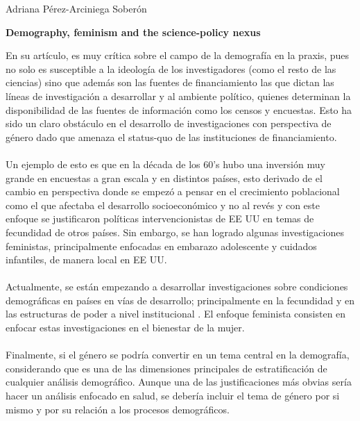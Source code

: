 \documentclass[11pt,spanish,letterpaper]{article}
\theoremstyle{plain}
\begin{document}
\begin{flushleft}
Adriana P\'erez-Arciniega Sober\'on
\end{flushleft}
\begin{center}
\textbf{Demography, feminism and the science-policy nexus}
\end{center} 
En su art\'iculo, \citep{presser1997demography} es muy cr\'itica sobre el campo de la demograf\'ia en la praxis, pues no solo es susceptible a la ideolog\'ia de los investigadores (como el resto de las ciencias)  sino que adem\'as son las fuentes de financiamiento las que dictan las l\'ineas de investigaci\'on a desarrollar y al ambiente pol\'itico, quienes determinan la disponibilidad de las fuentes de informaci\'on como los censos y encuestas. Esto ha sido un claro obst\'aculo en el desarrollo de investigaciones con perspectiva de g\'enero dado que amenaza el status-quo de las instituciones de financiamiento.\\
\\
Un ejemplo de esto es que en la d\'ecada de los 60's hubo una inversi\'on muy grande en encuestas a gran escala y en distintos pa\'ises, esto derivado de el cambio en perspectiva donde se empez\'o a pensar en el crecimiento poblacional como el que afectaba el desarrollo socioecon\'omico y no al rev\'es y con este enfoque se justificaron pol\'iticas intervencionistas de EE UU en temas de fecundidad de otros pa\'ises. Sin embargo, se han logrado algunas investigaciones feministas, principalmente enfocadas en embarazo adolescente y cuidados infantiles, de manera local en EE UU.\\
\\
Actualmente, se est\'an empezando a desarrollar investigaciones sobre condiciones demogr\'aficas en pa\'ises en v\'ias de desarrollo; principalmente en la fecundidad y en las estructuras de poder a nivel institucional . El enfoque feminista consisten en enfocar estas investigaciones en el bienestar de la mujer.\\
\\
Finalmente, \citep{presser1997demography} si el g\'enero se podr\'ia convertir en un tema central en la demograf\'ia, considerando que es una de las dimensiones principales de estratificaci\'on de cualquier an\'alisis demogr\'afico. Aunque una de las justificaciones m\'as obvias ser\'ia hacer un an\'alisis enfocado en salud, se deber\'ia incluir el tema de g\'enero por si mismo y por su relaci\'on a los procesos demogr\'aficos. 


\end{document}
